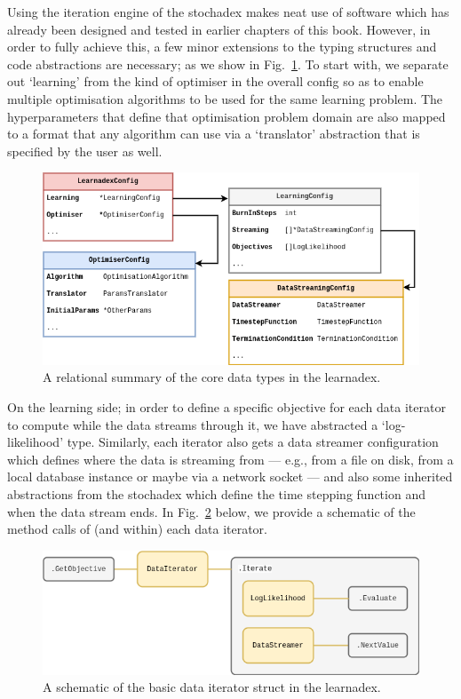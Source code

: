 Using the iteration engine of the stochadex makes neat use of software which has already been designed and tested in earlier chapters of this book. However, in order to fully achieve this, a few minor extensions to the typing structures and code abstractions are necessary; as we show in Fig.~\ref{fig:learnadex-data-types-design}. To start with, we separate out `learning' from the kind of optimiser in the overall config so as to enable multiple optimisation algorithms to be used for the same learning problem. The hyperparameters that define that optimisation problem domain are also mapped to a format that any algorithm can use via a `translator' abstraction that is specified by the user as well.

\begin{figure}[h]
\centering
\includegraphics[width=13cm]{images/chapter-4-learnadex-data-types.drawio.png}
\caption{A relational summary of the core data types in the learnadex.}
\label{fig:learnadex-data-types-design}
\end{figure}

On the learning side; in order to define a specific objective for each data iterator to compute while the data streams through it, we have abstracted a `log-likelihood' type. Similarly, each iterator also gets a data streamer configuration which defines where the data is streaming from --- e.g., from a file on disk, from a local database instance or maybe via a network socket --- and also some inherited abstractions from the stochadex which define the time stepping function and when the data stream ends. In Fig.~\ref{fig:learnadex-data-iterator} below, we provide a schematic of the method calls of (and within) each data iterator.

\begin{figure}[h]
\centering
\includegraphics[width=13cm]{images/chapter-4-learnadex-data-iterator.drawio.png}
\caption{A schematic of the basic data iterator struct in the learnadex.}
\label{fig:learnadex-data-iterator}
\end{figure}


